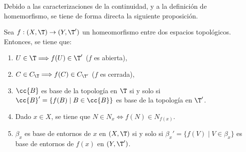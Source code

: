 Debido a las caracterizaciones de la continuidad, y a la definición de homemorfismo, se tiene de forma directa la siguiente proposición.
\begin{prop}
    Sea $f:(X,\T)\to (Y,\T')$ un homeomorfismo entre dos espacios topológicos. Entonces, se tiene que:
    \begin{enumerate}
        \item $U\in \T\Longrightarrow f(U)\in \T'$ \quad ($f$ es abierta),
        \item $C\in C_\T\Longrightarrow f(C)\in C_{\T'}$ \quad ($f$ es cerrada),
        \item $\cc{B}$ es base de la topología en $\T$ si y solo si $\cc{B}'=\{f(B)\mid B\in \cc{B}\}$ es base de la topología en $\T'$.
        \item Dado $x\in X$, se tiene que $N\in N_x \Longleftrightarrow f(N)\in N_{f(x)}$.
        \item $\beta_x$ es base de entornos de $x$ en $(X,\T)$ si y solo si $\beta_x'=\{f(V)\mid V\in \beta_x\}$ es base de entornos de $f(x)$ en $(Y,\T')$.
    \end{enumerate}
\end{prop}
